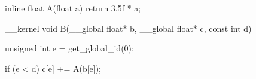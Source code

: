 inline float A(float a) {
  return 3.5f * a;
}

__kernel void B(__global float* b, __global float* c, const int d) {
  unsigned int e = get_global_id(0);

  if (e < d) {
    c[e] += A(b[e]);
  }
}
